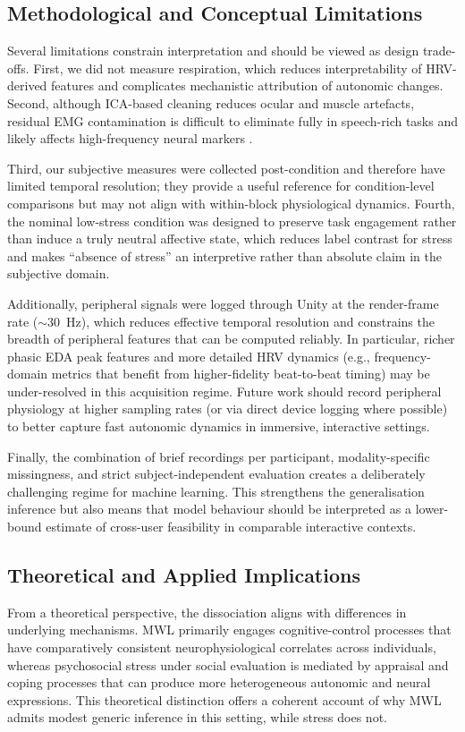\documentclass[lettersize,journal]{IEEEtran}
\begin{document}
\subsection{Methodological and Conceptual Limitations}
Several limitations constrain interpretation and should be viewed as design trade-offs. First, we did not measure respiration, which reduces interpretability of HRV-derived features and complicates mechanistic attribution of autonomic changes. Second, although ICA-based cleaning reduces ocular and muscle artefacts, residual EMG contamination is difficult to eliminate fully in speech-rich tasks and likely affects high-frequency neural markers \cite{goncharovaEMGContaminationEEG2003}.

Third, our subjective measures were collected post-condition and therefore have limited temporal resolution; they provide a useful reference for condition-level comparisons but may not align with within-block physiological dynamics. Fourth, the nominal low-stress condition was designed to preserve task engagement rather than induce a truly neutral affective state, which reduces label contrast for stress and makes ``absence of stress'' an interpretive rather than absolute claim in the subjective domain.

Additionally, peripheral signals were logged through Unity at the render-frame rate (\(\sim\)30~Hz), which reduces effective temporal resolution and constrains the breadth of peripheral features that can be computed reliably. In particular, richer phasic EDA peak features and more detailed HRV dynamics (e.g., frequency-domain metrics that benefit from higher-fidelity beat-to-beat timing) may be under-resolved in this acquisition regime. Future work should record peripheral physiology at higher sampling rates (or via direct device logging where possible) to better capture fast autonomic dynamics in immersive, interactive settings.

Finally, the combination of brief recordings per participant, modality-specific missingness, and strict subject-independent evaluation creates a deliberately challenging regime for machine learning. This strengthens the generalisation inference but also means that model behaviour should be interpreted as a lower-bound estimate of cross-user feasibility in comparable interactive contexts.

\subsection{Theoretical and Applied Implications}
From a theoretical perspective, the dissociation aligns with differences in underlying mechanisms. MWL primarily engages cognitive-control processes that have comparatively consistent neurophysiological correlates across individuals, whereas psychosocial stress under social evaluation is mediated by appraisal and coping processes that can produce more heterogeneous autonomic and neural expressions. This theoretical distinction offers a coherent account of why MWL admits modest generic inference in this setting, while stress does not.
\end{document}
